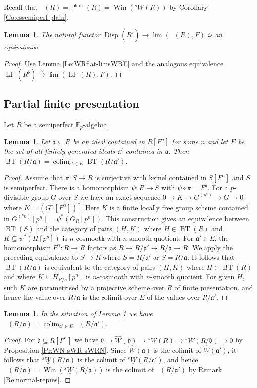 \documentclass[a4paper,11pt]{amsart}
\theoremstyle{plain}
\newtheorem{Lemma}[equation]{Lemma}
\theoremstyle{definition}
\theoremstyle{remark}
\newcommand{\bLe}{\begin{Lemma}}
\newcommand{\eLe}{\end{Lemma}}
\newcommand{\bproof}{\begin{proof}}
\newcommand{\eproof}{\end{proof}}
\renewcommand{\u}{\underline}
\numberwithin{equation}{section}
\newcommand{\Fa}{\mathfrak{a}}
\newcommand{\Fb}{\mathfrak{b}}
\newcommand{\FF}{{\mathbb{F}}}
\DeclareMathOperator{\colim}{colim}
\DeclareMathOperator{\plain}{plain}
\DeclareMathOperator{\BT}{BT}
\DeclareMathOperator{\Disp}{Disp}
\DeclareMathOperator{\sDisp}{{}^sDisp}
\DeclareMathOperator{\LF}{LF}
\DeclareMathOperator{\Win}{Win}
\newcommand{\sW}{{}^sW}
\newcommand{\usW}{{}^s\u W}
\begin{document}
Recall that $\sDisp(R)=\sDisp^{\plain}(R)=\Win(\usW(R))$ by Corollary \ref{Co:essemiperf-plain}.

\bLe
\label{Le:DispRflat-limsDispRF}
The natural functor $\Disp(R^\flat)\to\lim(\sDisp(R),F)$ is an equivalence.
\eLe

\bproof
Use Lemma \ref{Le:WRflat-limsWRF} and the analogous equivalence $\LF(R^\flat)\xrightarrow\sim\lim(\LF(R),F)$.
\eproof

\subsection{Partial finite presentation} 

Let $R$ be a semiperfect $\FF_p$-algebra.

\bLe
\label{Le:finite-pres-BT}
Let $\Fa\subseteq R$ be an ideal contained in $R[F^n]$ for some $n$ and let $E$ be the set of all finitely generated ideals $\Fa'$ contained in $\Fa$. Then
$\BT(R/\Fa)=\colim_{\Fa'\in E}\BT(R/\Fa')$.
\eLe

\bproof
Assume that $\pi\colon S\to R$ is surjective with kernel contained in $S[F^n]$ and $S$ is semiperfect. There is a homomorphism $\psi\colon R\to S$ with $\psi\circ \pi=F^n$. For a $p$-divisible group $G$ over $S$ we have an exact sequence $0\to K\to G^{(p^n)}\to G\to 0$ where $K=(G^\vee[F^n])^\vee$. Here $K$ is a finite locally free group scheme contained in $G^{(^pn)}[p^n]=\psi^*(G_R[p^n])$.
This construction gives an equivalence between $\BT(S)$ and the category of pairs $(H,K)$ where $H\in\BT(R)$ and $K\subseteq\psi^*(H[p^n])$ is $n$-cosmooth with $n$-smooth quotient.
For $\Fa'\in E$, the homomorphism $F^n\colon R\to R$ factors as $R\to R/\Fa'\to R/\Fa\to R$. We apply the preceding equivalence to $S\to R$ where $S=R/\Fa'$ or $S=R/\Fa$. It follows that $\BT(R/\Fa)$ is equivalent to the category of pairs $(H,K)$ where $H\in\BT(R)$ and where $K\subseteq H_{R/\Fa}[p^n]$ is $n$-cosmooth with $n$-smooth quotient. For given $H$, such $K$ are parametrised by a projective scheme over $R$ of finite presentation,  and hence the value over $R/\Fa$ is the colimit over $E$ of the values over $R/\Fa'$. 
\eproof

\bLe
\label{Le:finite-pres-sDisp}
In the situation of Lemma \ref{Le:finite-pres-BT} we have $\sDisp(R/\Fa)=\colim_{\Fa'\in E}\sDisp(R/\Fa')$.
\eLe

\bproof
For $\Fb\subseteq R[F^n]$ we have $0\to\hat W(\Fb)\to\sW(R)\to\sW(R/\Fb)\to 0$ by Proposition \ref{Pr:WN-sWR-sWRN}.
Since $\hat W(\Fa)$ is the colimit of $\hat W(\Fa')$, it follows that $\usW(R/\Fa)$ is the colimit of $\usW(R/\Fa')$, and hence $\sDisp(R/\Fa)=\Win(\usW(R/\Fa))$ is the colimit of $\sDisp(R/\Fa')$ by Remark \ref{Re:normal-repres}.
\eproof
\end{document}
